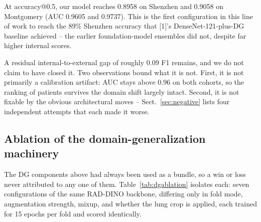 \documentclass[runningheads]{llncs}
\begin{document}
At accuracy@0.5, our model reaches 0.8958 on Shenzhen and 0.9058 on
Montgomery (AUC 0.9605 and 0.9737). This is the first configuration in this
line of work to reach the 89\% Shenzhen accuracy that [1]'s
DenseNet-121-plus-DG baseline achieved -- the earlier foundation-model
ensembles did not, despite far higher internal scores.

A residual internal-to-external gap of roughly 0.09 F1 remains, and we do
not claim to have closed it. Two observations bound what it is not. First,
it is not primarily a calibration artifact: AUC stays above 0.96 on both
cohorts, so the ranking of patients survives the domain shift largely
intact. Second, it is not fixable by the obvious architectural moves --
Sect.~\ref{sec:negative} lists four independent attempts that each made it
worse.

\subsection{Ablation of the domain-generalization machinery}
\label{sec:dgablation}

The DG components above had always been used as a bundle, so a win or loss
never attributed to any one of them. Table~\ref{tab:dgablation} isolates
each: seven configurations of the same RAD-DINO backbone, differing only in
fold mode, augmentation strength, mixup, and whether the lung crop is
applied, each trained for 15 epochs per fold and scored identically.
\end{document}
